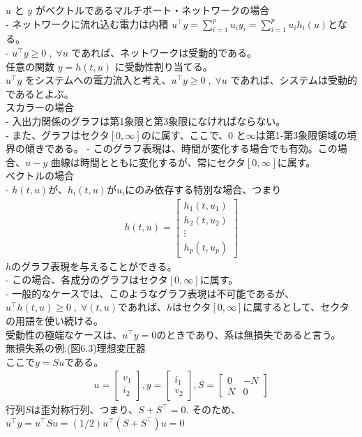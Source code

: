 \documentclass{jsarticle}
\begin{document}
$u$ と $y$ がベクトルであるマルチポート・ネットワークの場合\\
- ネットワークに流れ込む電力は内積 $u^\top y=\sum^p_{i=1}u_i y_i = \sum^p_{i=1}u_ih_i(u)$となる。\\
- $u^\top y\geq 0\;,\;\forall u$ であれば、ネットワークは受動的である。\\

任意の関数 $y = h(t, u)$ に受動性割り当てる。\\
$u^\top y$ をシステムへの電力流入と考え、$u^\top y\geq 0\;,\;\forall u$ であれば、システムは受動的であるとよぶ。\\

スカラーの場合\\
- 入出力関係のグラフは第1象限と第3象限になければならない。\\
- また、グラフはセクタ$[0, \infty]$のに属す、ここで、$0$ と$\infty$は第1-第3象限領域の境界の傾きである。
- このグラフ表現は、時間が変化する場合でも有効。この場合、$u-y$ 曲線は時間とともに変化するが、常にセクタ$[0, \infty]$に属す。\\

ベクトルの場合\\
- $h(t, u)$が、$h_i(t, u)$が$u_i$にのみ依存する特別な場合、つまり
\begin{align}
  h(t,u) = 
  \begin{bmatrix}
    h_1(t,u_1)\\
    h_2(t,u_2)\\
    \vdots \\
    h_p(t,u_p)
  \end{bmatrix} \tag{6.1}
\end{align}
$h$のグラフ表現を与えることができる。\\
- この場合、各成分のグラフはセクタ$[0, \infty]$に属す。\\
- 一般的なケースでは、このようなグラフ表現は不可能であるが、$u^\top h(t, u) \geq 0\;,\;\forall (t,u)$であれば、$h$はセクタ$[0, \infty]$に属するとして、セクタの用語を使い続ける。\\

受動性の極端なケースは、$u^\top y=0$のときであり、系は無損失であると言う。\\
無損失系の例:(図6.3)理想変圧器\\
ここで$y = Su$である。
\begin{align*}
  u = \begin{bmatrix}
    v_1 \\ i_2
  \end{bmatrix},
  y = \begin{bmatrix}
    i_1 \\ v_2
  \end{bmatrix},
  S = \begin{bmatrix}
    0 & -N \\
    N & 0
  \end{bmatrix}
\end{align*}
行列$S$は歪対称行列、つまり、$S+S^\top =0$.
そのため、$u^\top y = u^\top Su = (1/2)u^\top (S+S^\top )u =0$\\
\end{document}
